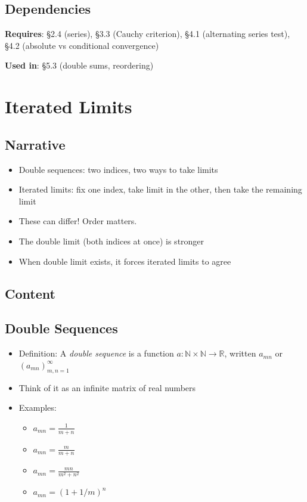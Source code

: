 \documentclass[
  10pt,
  letterpaper,
]{scrbook}
\providecommand{\tightlist}{%
  \setlength{\itemsep}{0pt}\setlength{\parskip}{0pt}}
\begin{document}
\subsection{Dependencies}\label{dependencies-20}

\textbf{Requires}: §2.4 (series), §3.3 (Cauchy criterion), §4.1
(alternating series test), §4.2 (absolute vs conditional convergence)

\textbf{Used in}: §5.3 (double sums, reordering)

\section{Iterated Limits}\label{iterated-limits}

\subsection{Narrative}\label{narrative-21}

\begin{itemize}
\tightlist
\item
  Double sequences: two indices, two ways to take limits
\item
  Iterated limits: fix one index, take limit in the other, then take the
  remaining limit
\item
  These can differ! Order matters.
\item
  The double limit (both indices at once) is stronger
\item
  When double limit exists, it forces iterated limits to agree
\end{itemize}

\subsection{Content}\label{content-21}

\subsection{Double Sequences}\label{double-sequences}

\begin{itemize}
\tightlist
\item
  Definition: A \emph{double sequence} is a function
  \(a: \mathbb{N} \times \mathbb{N} \to \mathbb{R}\), written \(a_{mn}\)
  or \((a_{mn})_{m,n=1}^{\infty}\)
\item
  Think of it as an infinite matrix of real numbers
\item
  Examples:

  \begin{itemize}
  \tightlist
  \item
    \(a_{mn} = \frac{1}{m+n}\)
  \item
    \(a_{mn} = \frac{m}{m+n}\)
  \item
    \(a_{mn} = \frac{mn}{m^2 + n^2}\)
  \item
    \(a_{mn} = (1 + 1/m)^n\)
  \end{itemize}
\end{itemize}
\end{document}
